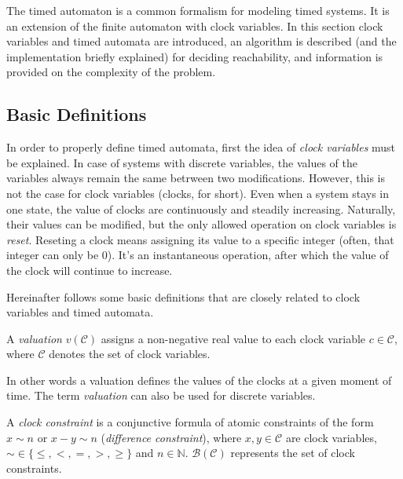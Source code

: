 The timed automaton is a common formalism for modeling timed systems. It is an extension of the finite automaton with clock variables. In this section clock variables and timed automata are introduced, an algorithm is described (and the implementation briefly explained) for deciding reachability, and information is provided on the complexity of the problem.

\subsection{Basic Definitions}


In order to properly define timed automata, first the idea of \emph{clock variables} must be explained. In case of systems with discrete variables, the values of the variables always remain the same betrween two modifications. However, this is not the case for clock variables (clocks, for short). Even when a system stays in one state, the value of clocks are continuously and steadily increasing. Naturally, their values can be modified, but the only allowed operation on clock variables is \emph{reset}. Reseting a clock means assigning its value to a specific integer (often, that integer can only be 0). It's an instantaneous operation, after which the value of the clock will continue to increase.


Hereinafter follows some basic definitions that are closely related to clock variables and timed automata. 

\begin{dfn}
	A \emph{valuation} $v(\mathcal{C})$ assigns a non-negative real value
	to each clock variable $c \in \mathcal{C}$, where $\mathcal{C}$ denotes the set of clock
	variables.
\end{dfn}

In other words a valuation defines the values of the clocks at a given moment of time. The term \emph{valuation} can also be used for discrete variables.

\begin{dfn}
	A \emph{clock constraint} is a conjunctive formula of atomic
	constraints of the form $x \sim n$ or $x - y \sim n$ (\emph{difference
		constraint}), where $x,y \in \mathcal{C}$ are clock variables, $\sim \in \{\leq,<,=,>,\geq\}$ and \hbox{$n \in \mathbb{N}$}. $\mathcal{B}(\mathcal{C})$ represents the set of clock
	constraints.
\end{dfn}

